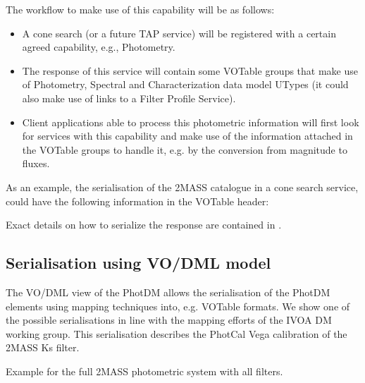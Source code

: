 \documentclass[11pt,a4paper]{ivoa}
\begin{document}
\begin{appendices}
The workflow to make use of this capability will be as follows:
\par

\begin{itemize}
	\item{A cone search (or a future TAP service) will be registered with a
	certain agreed capability, e.g., Photometry.\par}

	\item{The response of this service will contain some VOTable groups that
	make use of Photometry, Spectral and Characterization data model UTypes
	(it could also make use of links to a Filter Profile Service).\par}

	\item{Client applications able to process this photometric information
	will first look for services with this capability and make use of the
	information attached in the VOTable groups to handle it, e.g. by the
	conversion from magnitude to fluxes.}
\end{itemize}\par

As an example, the serialisation of the 2MASS catalogue in a cone search service,
could have the following information in the VOTable header:
\par


Exact details on how to serialize the response are contained in \citep{derriere}.

\subsection{Serialisation using VO/DML model} \label{appendixmapping}
The VO/DML view of the PhotDM allows the serialisation of the PhotDM elements
using mapping techniques into, e.g. VOTable formats. We show one of the possible
serialisations in line with the mapping efforts of the IVOA DM working group.
This serialisation describes the PhotCal Vega calibration of the 2MASS Ks filter.
\par



 Example for the full 2MASS photometric system with all filters.



\end{appendices}


\end{document}
